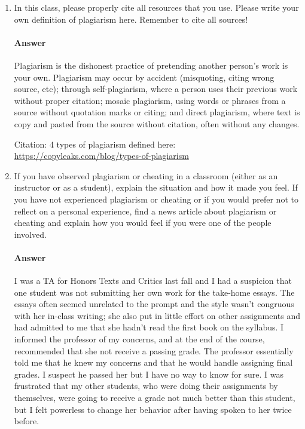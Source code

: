 \documentclass{article}
\begin{document}
\begin{enumerate}

    \item In this class, please properly cite all resources that you use. Please
        write your own definition of plagiarism here.  Remember to cite all
        sources!

        \paragraph{Answer}{Plagiarism is the dishonest practice of pretending another person's work is your own. Plagiarism may occur by accident (misquoting, citing wrong source, etc); through self-plagiarism, where a person uses their previous work without proper citation; mosaic plagiarism, using words or phrases from a source without quotation marks or citing; and direct plagiarism, where text is copy and pasted from the source without citation, often without any changes.} 

Citation: 4 types of plagiarism defined here: \url{https://copyleaks.com/blog/types-of-plagiarism}


    \item If you have observed plagiarism or cheating in a classroom (either as
        an instructor or as a student), explain the situation and how it made
        you feel.  If you have not experienced plagiarism or cheating or if you
        would prefer not to reflect on a personal experience, find a news
        article about plagiarism or cheating and explain how you would feel if
        you were one of the people involved.

        \paragraph{Answer}{I was a TA for Honors Texts and Critics last fall and I had a suspicion that one student was not submitting her own work for the take-home essays. The essays often seemed unrelated to the prompt and the style wasn't congruous with her in-class writing; she also put in little effort on other assignments and had admitted to me that she hadn't read the first book on the syllabus. I informed the professor of my concerns, and at the end of the course, recommended that she not receive a passing grade. The professor essentially told me that he knew my concerns and that he would handle assigning final grades. I suspect he passed her but I have no way to know for sure. I was frustrated that my other students, who were doing their assignments by themselves, were going to receive a grade not much better than this student, but I felt powerless to change her behavior after having spoken to her twice before.}
\end{enumerate}
\end{document}
